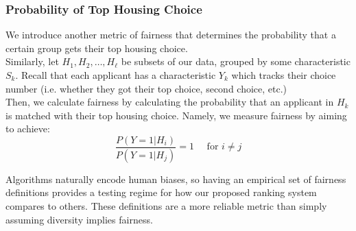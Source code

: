 \documentclass[11pt]{article}
\begin{document}
\subsubsection{Probability of Top Housing Choice}
We introduce another metric of fairness that determines the probability that a certain group gets their top housing choice. \\
\newline
Similarly, let $H_1, H_2, \dots, H_\ell$ be subsets of our data, grouped by some characteristic $S_k$. Recall that each applicant has a characteristic $Y_k$ which tracks their choice number (i.e. whether they got their top choice, second choice, etc.) \\
\newline
Then, we calculate fairness by calculating the probability that an applicant in $H_k$ is matched with their top housing choice. Namely, we measure fairness by aiming to achieve:
\[\frac{P(Y = 1 | H_i)}{P(Y = 1 | H_j)} = 1 \quad \text{ for } i \neq j\]

Algorithms naturally encode human biases, so having an empirical set of fairness definitions provides a testing regime for how our proposed ranking system compares to others. These definitions are a more reliable metric than simply assuming diversity implies fairness. 
\end{document}

